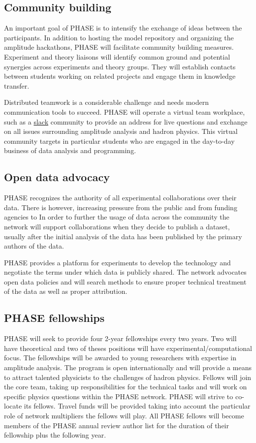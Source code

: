 \subsection{Community building}
\label{sec:community}
An important goal of PHASE is to intensify the exchange of ideas between the participants. In addition to hosting the model repository and organizing the amplitude hackathons, PHASE will facilitate community building measures. Experiment and theory liaisons will identify common ground and potential synergies across experiments and theory groups. They will establish contacts between students working on related projects and engage them in knowledge transfer.

Distributed teamwork is a considerable challenge and needs modern communication tools to succeed. PHASE will operate a virtual team workplace, such as a \href{http://slack.com}{slack} community to provide an address for live questions and exchange on all issues surrounding amplitude analysis and hadron physics. This virtual community targets in particular students who are engaged in the day-to-day business of data analysis and programming.

\subsection{Open data advocacy}
\label{sec:opendata}
PHASE recognizes the authority of all experimental collaborations over their data. There is however, increasing pressure from the public and from  funding agencies to  In order to further the usage of data across the community the network will support collaborations when they decide to publish a dataset, usually after the initial analysis of the data has been published by the primary authors of the data. 

PHASE provides a platform for experiments to develop the technology and negotiate the terms under which data is publicly shared. The network advocates open data policies and will search methods to ensure proper technical treatment of the data as well as proper attribution.


\subsection{PHASE fellowships}
\label{sec:fellowships}
PHASE will seek to provide four 2-year fellowships every two years. Two will have theoretical and two of theses positions will have experimental/computational focus. The fellowships will be awarded to young researchers with expertise in amplitude analysis. The program is open internationally and will provide a means to attract talented physicists to the challenges of hadron physics. Fellows will join the core team, taking up responsibilities for the technical tasks and will work on specific physics questions within the PHASE network. PHASE will strive to co-locate its fellows. Travel funds will be provided taking into account the particular role of network multipliers the fellows will play. All PHASE fellows will become members of the PHASE annual review author list for the duration of their fellowship plus the following year.     
